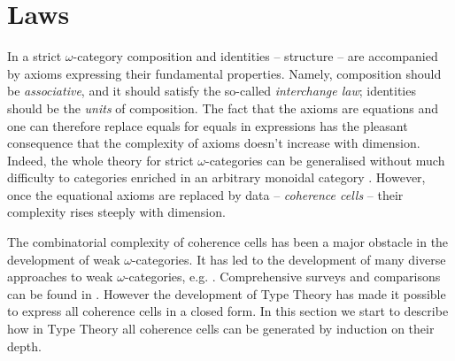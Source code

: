\section{Laws}
\label{sec:laws}


%
In a strict $\omega$-category composition and
identities -- structure -- are accompanied by axioms expressing their fundamental
properties. Namely, composition should be \emph{associative}, and it
should satisfy the so-called \emph{interchange law}; identities should
be the \emph{units} of composition. The fact that the axioms are
equations and one can therefore replace equals for equals in
expressions has the pleasant consequence that the
complexity of axioms doesn't increase with dimension. Indeed, the whole theory
for strict $\omega$-categories can be generalised without much difficulty
to categories enriched in an arbitrary monoidal
category \cite{kelly:1982}. However, once 
the equational axioms are replaced by data -- \emph{coherence cells} -- their
complexity rises steeply with dimension. 

The combinatorial complexity of coherence cells has been a major
obstacle in the development of weak $\omega$-categories. It has led
to the development of many diverse approaches to weak
$\omega$-categories,
e.g. \cite{street87:simplexes,batanin98:monoidal-globular,baez:1998,
trimble:1999,penon:1999,leinster:2000,lumsdaine10:weak-o-categories}. Comprehensive
surveys and comparisons can be found in
\cite{leinster:survey,cheng:guidebook}. However the development of
Type Theory has made it possible to express all coherence cells in a
closed form. In this section we start to describe how in Type Theory
all coherence cells can be generated by induction on their depth.


